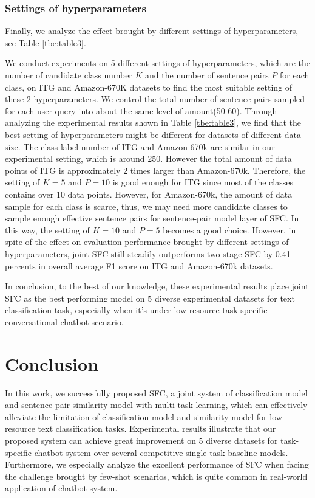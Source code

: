 \documentclass[letterpaper]{article} %
\begin{document}
  \subsubsection*{Settings  of  hyperparameters} 
  Finally, we analyze the effect brought
  by  different  settings  of  hyperparameters,  see  Table \ref{tbe:table3}. 

  We  conduct  experiments on 5 different settings of hyperparameters, which are
  the  number of candidate class number $K$ and the number of sentence pairs $P$
  for  each  class,  on  ITG  and Amazon-670K datasets to find the most suitable
  setting  of  these  2 hyperparameters. We control the total number of sentence
  pairs  sampled for each user query into about the same level of amount(50-60).
  Through  analyzing the experimental results shown in Table \ref{tbe:table3}, we
  find  that the best setting of hyperparameters might be different for datasets
  of  different  data  size.  The  class label number of ITG and Amazon-670k are
  similar  in  our  experimental setting, which is around 250. However the total
  amount of data points of ITG is approximately 2 times larger than Amazon-670k.
  Therefore,  the  setting of $K=5$ and $P=10$ is good enough for ITG since most
  of  the  classes  contains  over 10 data points. However, for Amazon-670k, the
  amount  of  data  sample  for  each  class  is  scarce, thus, we may need more
  candidate  classes to sample enough effective sentence pairs for sentence-pair
  model  layer  of  SFC.  In this way, the setting of $K=10$ and $P=5$ becomes a
  good choice. However, in spite of the effect on evaluation performance brought
  by different settings of hyperparameters, joint SFC still steadily outperforms
  two-stage  SFC  by  0.41  percents  in  overall  average  F1 score  on  ITG and
  Amazon-670k datasets.

  In  conclusion, to the best of our knowledge, these experimental results place
  joint  SFC as the best performing model on 5 diverse experimental datasets for
  text   classification   task,   especially   when   it's   under  low-resource
  task-specific conversational chatbot scenario.

  \section{Conclusion}
  In  this  work, we successfully proposed SFC, a joint system of classification
  model  and  sentence-pair similarity model with multi-task learning, which can
  effectively  alleviate  the  limitation of classification model and similarity
  model   for  low-resource  text  classification  tasks.  Experimental  results
  illustrate that our proposed system can achieve great improvement on 5 diverse
  datasets for task-specific chatbot system over several competitive single-task
  baseline  models. Furthermore, we especially analyze the excellent performance
  of SFC when facing the challenge brought by few-shot scenarios, which is quite
  common in real-world application of chatbot system.

  
  
\end{document}
